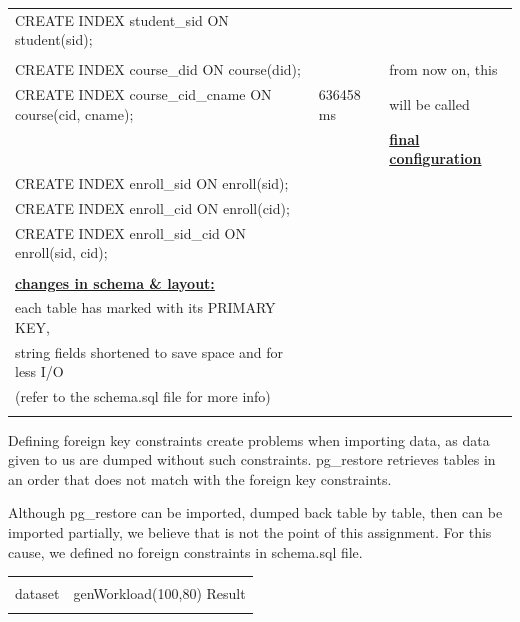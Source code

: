 \documentclass[10pt]{article}
\begin{document}
\begin{enumerate}
\begin{table}[H]
\begin{tabular}{|P{9.7cm} | P{4.4cm} | p{3.5cm} |}
				CREATE INDEX student\_sid ON student(sid); &&\\
				&&\\
				
				CREATE INDEX course\_did ON course(did);&& from now on, this\\
				CREATE INDEX course\_cid\_cname ON course(cid, cname);& 636458 ms&will be called\\
				&& \textbf{\underline{final configuration}}\\
				
				CREATE INDEX enroll\_sid ON enroll(sid);&&\\
				CREATE INDEX enroll\_cid ON enroll(cid);&&\\
				CREATE INDEX enroll\_sid\_cid ON enroll(sid, cid);&&\\
				&&\\
				
				\textbf{\underline{changes in schema \& layout:}}&&\\
				each table has marked with its PRIMARY KEY,&& \\
				string fields shortened to save space and for less I/O&&\\
				(refer to the schema.sql file for more info) &&\\
				
				&&\\
				\hline
				
				
				
			\end{tabular}
			\vspace{1em}
			
			Defining foreign key constraints create problems when importing data, as data given to us are dumped without such constraints. pg\_restore retrieves tables in an order that does not match with the foreign key constraints.
			\bigskip
			
			Although pg\_restore can be imported, dumped back table by table, then can be imported partially, we believe that is not the point of this assignment. For this cause, we defined no foreign constraints in schema.sql file.
		\end{table}
		
		\begin{table}[H]
			\centering
			\begin{tabular}{|P{9.7cm} | P{6cm}|}
				\hline
				&\\
				dataset& genWorkload(100,80) Result\\
				&\\
				\hline
				

\end{tabular}
\end{table}
\end{enumerate}
\end{document}
